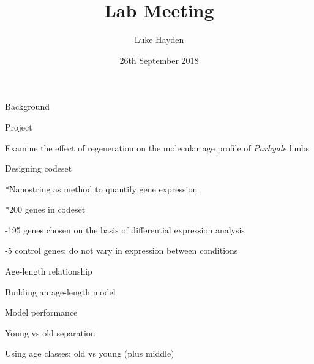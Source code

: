 \documentclass[ignorenonframetext,]{beamer}
\title{Lab Meeting}
\author{Luke Hayden}
\date{26th September 2018}
\begin{document}
\frame{\titlepage}

\begin{frame}{Background}

\begin{block}{Project}

Examine the effect of regeneration on the molecular age profile of
\emph{Parhyale} limbs

\end{block}

\begin{block}{Designing codeset}

*Nanostring as method to quantify gene expression

*200 genes in codeset

-195 genes chosen on the basis of differential expression analysis

-5 control genes: do not vary in expression between conditions

\end{block}

\end{frame}

\begin{frame}{Age-length relationship}

\end{frame}

\begin{frame}{Building an age-length model}

\end{frame}

\begin{frame}{Model performance}

\end{frame}

\begin{frame}{Young vs old separation}

Using age classes: old vs young (plus middle)

\end{frame}
\end{document}
